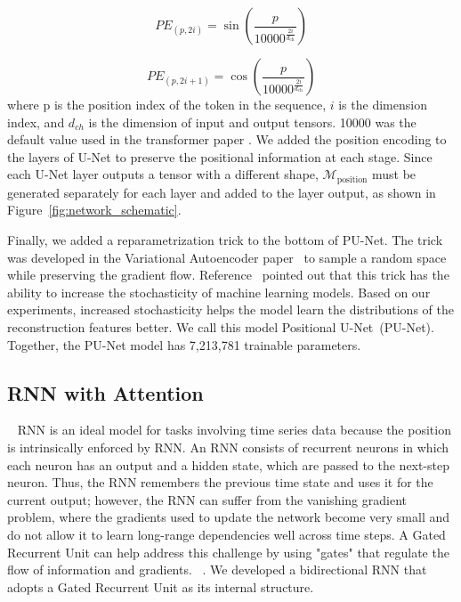 \begin{equation}
PE_{(p, 2i)} = \sin\left(\frac{p}{10000^{\frac{2i}{d_{\text{ch}}}}}\right)
\label{eqn:positional_encoding_sin}
\end{equation}

\begin{equation}
PE_{(p, 2i+1)} = \cos\left(\frac{p}{10000^{\frac{2i}{d_{\text{ch}}}}}\right)
\label{eqn:positional_encoding_cos}
\end{equation}
where p is the position index of the token in the sequence, $i$ is the dimension index, and $d_{ch}$ is the dimension of input and output tensors. 10000 was the default value used in the transformer paper \cite{Transformer}. We added the position encoding to the layers of U-Net to preserve the positional information at each stage. Since each U-Net layer outputs a tensor with a different shape, $\mathcal{M}_{\mathrm{position}}$ must be generated separately for each layer and added to the layer output, as shown in Figure~\ref{fig:network_schematic}.

Finally, we added a reparametrization trick to the bottom of PU-Net. The trick was developed in the Variational Autoencoder paper~\cite{VAE} to sample a random space while preserving the gradient flow. Reference~\cite{AAE} pointed out that this trick has the ability to increase the stochasticity of machine learning models. Based on our experiments, increased stochasticity helps the model learn the distributions of the reconstruction features better. We call this model Positional U-Net~(PU-Net). Together, the PU-Net model has 7,213,781 trainable parameters.

\subsection{RNN with Attention}~\label{subapp:RNN}
RNN is an ideal model for tasks involving time series data because the position is intrinsically enforced by RNN. \cite{Rumelhart1986} An RNN consists of recurrent neurons in which each neuron has an output and a hidden state, which are passed to the next-step neuron. Thus, the RNN remembers the previous time state and uses it for the current output; however, the RNN can suffer from the vanishing gradient problem, where the gradients used to update the network become very small and do not allow it to learn long-range dependencies well across time steps. A Gated Recurrent Unit can help address this challenge by using "gates" that regulate the flow of information and gradients. ~\cite{GRU}. We developed a bidirectional RNN that adopts a Gated Recurrent Unit \cite{GRU} as its internal structure.

